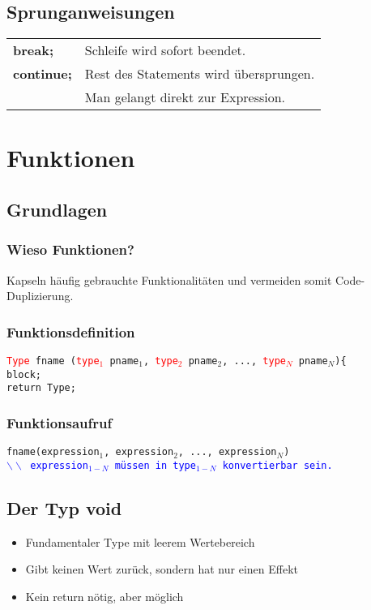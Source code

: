 \documentclass[a3paper, 10pt, landscape]{scrartcl}
\newcommand{\code}[1]{\texttt{#1}}
\begin{document}
\begin{multicols*}{3}
	
	\subsection{Sprunganweisungen}
	\begin{tabular}{l l}
	\textbf{break;} & Schleife wird sofort beendet. \\
	\textbf{continue;} & Rest des Statements wird übersprungen. \\
	& Man gelangt direkt zur Expression.
		
	\end{tabular}
		

\section{Funktionen}
	\subsection{Grundlagen}
	\subsubsection{Wieso Funktionen?}
	Kapseln häufig gebrauchte Funktionalitäten und vermeiden somit Code-Duplizierung. 
	
	\subsubsection{Funktionsdefinition}
	\code{\textcolor{red}{Type} fname (\textcolor{red}{type$_1$} pname$_1$, \textcolor{red}{type$_2$} pname$_2$, ..., \textcolor{red}{type$_N$} pname$_N$)\{ \\
	\phantom{Type }block; \\
	\phantom{Type }return Type; \\
	}	
	\subsubsection{Funktionsaufruf}
	\code{fname(expression$_1$, expression$_2$, ..., expression$_N$)\\ \textcolor{blue}{$\backslash \backslash$ expression$_{1-N}$ müssen in type$_{1-N}$ konvertierbar sein.}
	}
	\subsection{Der Typ void}
	\begin{itemize}
		\item Fundamentaler Type mit leerem Wertebereich
		\item Gibt keinen Wert zurück, sondern hat nur einen Effekt
		\item Kein return nötig, aber möglich
	\end{itemize}
	

\end{multicols*}
\end{document}
